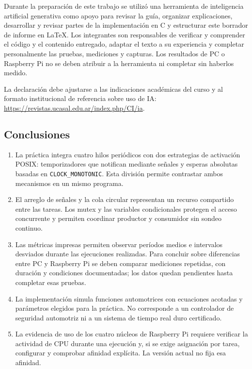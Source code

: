 \documentclass[12pt,a4paper]{article}
\begin{document}
Durante la preparación de este trabajo se utilizó una herramienta de inteligencia artificial generativa como apoyo para revisar la guía, organizar explicaciones, desarrollar y revisar partes de la implementación en C y estructurar este borrador de informe en \LaTeX. Los integrantes son responsables de verificar y comprender el código y el contenido entregado, adaptar el texto a su experiencia y completar personalmente las pruebas, mediciones y capturas. Los resultados de PC o Raspberry Pi no se deben atribuir a la herramienta ni completar sin haberlos medido.

La declaración debe ajustarse a las indicaciones académicas del curso y al formato institucional de referencia sobre uso de IA: \url{https://revistas.ucasal.edu.ar/index.php/CI/ia}.

\subsection{Conclusiones}

\begin{enumerate}
  \item La práctica integra cuatro hilos periódicos con dos estrategias de activación POSIX: temporizadores que notifican mediante señales y esperas absolutas basadas en \texttt{CLOCK\_MONOTONIC}. Esta división permite contrastar ambos mecanismos en un mismo programa.
  \item El arreglo de señales y la cola circular representan un recurso compartido entre las tareas. Los mutex y las variables condicionales protegen el acceso concurrente y permiten coordinar productor y consumidor sin sondeo continuo.
  \item Las métricas impresas permiten observar períodos medios e intervalos desviados durante las ejecuciones realizadas. Para concluir sobre diferencias entre PC y Raspberry Pi se deben comparar mediciones repetidas, con duración y condiciones documentadas; los datos quedan pendientes hasta completar esas pruebas.
  \item La implementación simula funciones automotrices con ecuaciones acotadas y parámetros elegidos para la práctica. No corresponde a un controlador de seguridad automotriz ni a un sistema de tiempo real duro certificado.
  \item La evidencia de uso de los cuatro núcleos de Raspberry Pi requiere verificar la actividad de CPU durante una ejecución y, si se exige asignación por tarea, configurar y comprobar afinidad explícita. La versión actual no fija esa afinidad.
\end{enumerate}
\end{document}
